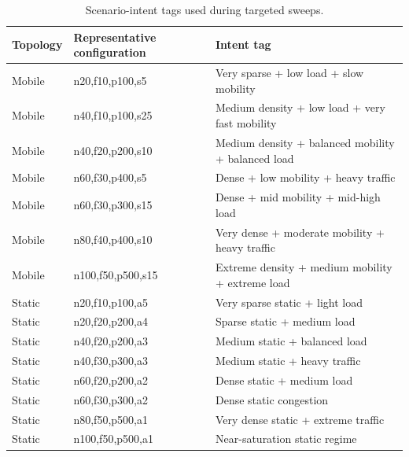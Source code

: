 \documentclass[11pt,a4paper]{article}
\begin{document}
\begin{table}[h]
\centering
\caption{Scenario-intent tags used during targeted sweeps.}
\small
\begin{tabular}{l l l}
    \toprule
    \textbf{Topology} & \textbf{Representative configuration} & \textbf{Intent tag} \\
\midrule
Mobile & n20,f10,p100,s5   & \cellcolor{lightgreen}Very sparse + low load + slow mobility \\
Mobile & n40,f10,p100,s25  & \cellcolor{lightyellow}Medium density + low load + very fast mobility \\
Mobile & n40,f20,p200,s10  & \cellcolor{lightyellow}Medium density + balanced mobility + balanced load \\
Mobile & n60,f30,p400,s5   & \cellcolor{lightred}Dense + low mobility + heavy traffic \\
Mobile & n60,f30,p300,s15  & \cellcolor{lightred}Dense + mid mobility + mid-high load \\
Mobile & n80,f40,p400,s10  & \cellcolor{lightred}Very dense + moderate mobility + heavy traffic \\
Mobile & n100,f50,p500,s15 & \cellcolor{lightred}Extreme density + medium mobility + extreme load \\
Static & n20,f10,p100,a5   & \cellcolor{lightgreen}Very sparse static + light load \\
Static & n20,f20,p200,a4   & \cellcolor{lightyellow}Sparse static + medium load \\
Static & n40,f20,p200,a3   & \cellcolor{lightyellow}Medium static + balanced load \\
Static & n40,f30,p300,a3   & \cellcolor{lightred}Medium static + heavy traffic \\
Static & n60,f20,p200,a2   & \cellcolor{lightyellow}Dense static + medium load \\
Static & n60,f30,p300,a2   & \cellcolor{lightred}Dense static congestion \\
Static & n80,f50,p500,a1   & \cellcolor{lightred}Very dense static + extreme traffic \\
Static & n100,f50,p500,a1  & \cellcolor{lightred}Near-saturation static regime \\
\bottomrule
\end{tabular}
\end{table}
\end{document}
